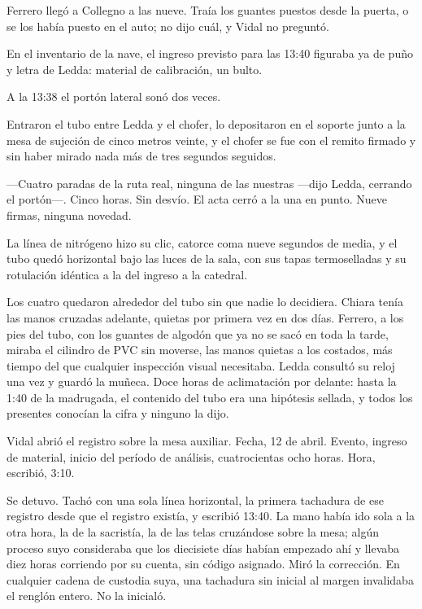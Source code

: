 Ferrero llegó a Collegno a las nueve. Traía los guantes puestos desde la puerta, o se los había puesto en el auto; no dijo cuál, y Vidal no preguntó.

En el inventario de la nave, el ingreso previsto para las 13:40 figuraba ya de puño y letra de Ledda: material de calibración, un bulto.

A la 13:38 el portón lateral sonó dos veces.

Entraron el tubo entre Ledda y el chofer, lo depositaron en el soporte junto a la mesa de sujeción de cinco metros veinte, y el chofer se fue con el remito firmado y sin haber mirado nada más de tres segundos seguidos.

---Cuatro paradas de la ruta real, ninguna de las nuestras ---dijo Ledda, cerrando el portón---. Cinco horas. Sin desvío. El acta cerró a la una en punto. Nueve firmas, ninguna novedad.

La línea de nitrógeno hizo su clic, catorce coma nueve segundos de media, y el tubo quedó horizontal bajo las luces de la sala, con sus tapas termoselladas y su rotulación idéntica a la del ingreso a la catedral.

Los cuatro quedaron alrededor del tubo sin que nadie lo decidiera. Chiara tenía las manos cruzadas adelante, quietas por primera vez en dos días. Ferrero, a los pies del tubo, con los guantes de algodón que ya no se sacó en toda la tarde, miraba el cilindro de PVC sin moverse, las manos quietas a los costados, más tiempo del que cualquier inspección visual necesitaba. Ledda consultó su reloj una vez y guardó la muñeca. Doce horas de aclimatación por delante: hasta la 1:40 de la madrugada, el contenido del tubo era una hipótesis sellada, y todos los presentes conocían la cifra y ninguno la dijo.

Vidal abrió el registro sobre la mesa auxiliar. Fecha, 12 de abril. Evento, ingreso de material, inicio del período de análisis, cuatrocientas ocho horas. Hora, escribió, 3:10.

Se detuvo. Tachó con una sola línea horizontal, la primera tachadura de ese registro desde que el registro existía, y escribió 13:40. La mano había ido sola a la otra hora, la de la sacristía, la de las telas cruzándose sobre la mesa; algún proceso suyo consideraba que los diecisiete días habían empezado ahí y llevaba diez horas corriendo por su cuenta, sin código asignado. Miró la corrección. En cualquier cadena de custodia suya, una tachadura sin inicial al margen invalidaba el renglón entero. No la inicialó.

